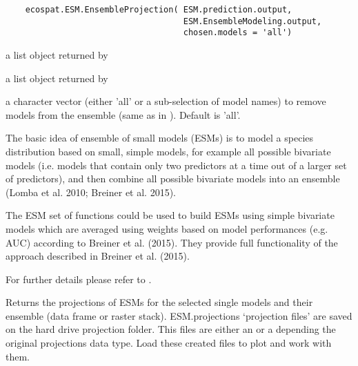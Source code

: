 \documentclass[a4paper]{book}
\begin{document}
%
\begin{Usage}
\begin{verbatim}
    ecospat.ESM.EnsembleProjection( ESM.prediction.output, 
                                    ESM.EnsembleModeling.output,
                                    chosen.models = 'all')
\end{verbatim}
\end{Usage}
%
\begin{Arguments}
\begin{ldescription}
\item[\code{ESM.prediction.output}] a list object returned by 


\item[\code{ESM.EnsembleModeling.output}] 
a list object returned by 
\item[\code{chosen.models}] a character vector (either 'all' or a sub-selection of model names) to remove models from the ensemble (same as in ). Default is 'all'.

\end{ldescription}
\end{Arguments}
%
\begin{Details}\relax
The basic idea of ensemble of small models (ESMs) is to model a species distribution based on small, simple models, for example all possible bivariate models (i.e. models that contain only two predictors at a time out of a larger set of predictors), and then combine all possible bivariate models into an ensemble (Lomba et al. 2010; Breiner et al. 2015).

The ESM set of functions could be used to build ESMs using simple bivariate models which are averaged using weights based on model performances (e.g. AUC) according to Breiner et al. (2015). They provide full functionality of the approach described in Breiner et al. (2015).

For further details please refer to .

\end{Details}
%
\begin{Value}
Returns the projections of ESMs for the selected single models and their ensemble (data frame or raster stack). ESM.projections `projection files' are saved on the hard drive projection folder. This files are either an  or a  depending the original projections data type.
Load these created files to plot and work with them.

\end{Value}
\end{document}
